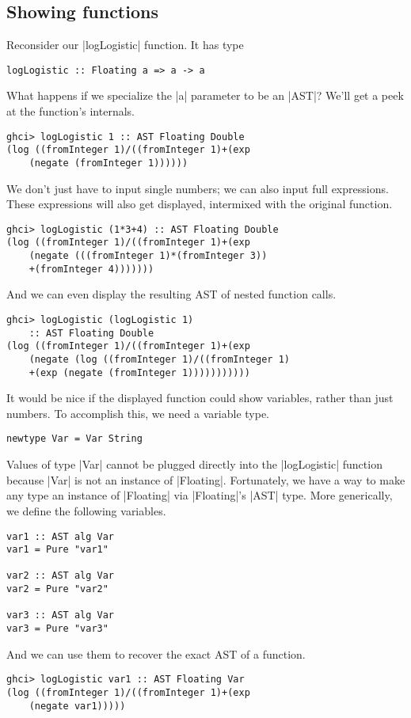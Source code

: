 \documentclass[preprint]{sigplanconf}
\theoremstyle{definition}
\begin{document}
\subsection{Showing functions}
Reconsider our |logLogistic| function.
It has type
\begin{lstlisting}
logLogistic :: Floating a => a -> a
\end{lstlisting}
What happens if we specialize the |a| parameter to be an |AST|?
We'll get a peek at the function's internals.
\begin{lstlisting}
ghci> logLogistic 1 :: AST Floating Double
(log ((fromInteger 1)/((fromInteger 1)+(exp
    (negate (fromInteger 1))))))
\end{lstlisting}
We don't just have to input single numbers;
we can also input full expressions.
These expressions will also get displayed,
intermixed with the original function.
\begin{lstlisting}
ghci> logLogistic (1*3+4) :: AST Floating Double
(log ((fromInteger 1)/((fromInteger 1)+(exp
    (negate (((fromInteger 1)*(fromInteger 3))
    +(fromInteger 4)))))))
\end{lstlisting}
And we can even display the resulting AST of nested function calls.
\begin{lstlisting}
ghci> logLogistic (logLogistic 1)
    :: AST Floating Double
(log ((fromInteger 1)/((fromInteger 1)+(exp
    (negate (log ((fromInteger 1)/((fromInteger 1)
    +(exp (negate (fromInteger 1)))))))))))
\end{lstlisting}
It would be nice if the displayed function could show variables,
rather than just numbers.
To accomplish this, we need a variable type.
\begin{lstlisting}
newtype Var = Var String
\end{lstlisting}
Values of type |Var| cannot be plugged directly into the |logLogistic| function because |Var| is not an instance of |Floating|.
Fortunately, we have a way to make any type an instance of |Floating| via |Floating|'s |AST| type.
More generically, we define the following variables.
\begin{lstlisting}
var1 :: AST alg Var
var1 = Pure "var1"

var2 :: AST alg Var
var2 = Pure "var2"

var3 :: AST alg Var
var3 = Pure "var3"
\end{lstlisting}
And we can use them to recover the exact AST of a function.
\begin{lstlisting}
ghci> logLogistic var1 :: AST Floating Var
(log ((fromInteger 1)/((fromInteger 1)+(exp
    (negate var1)))))
\end{lstlisting}
\end{document}
